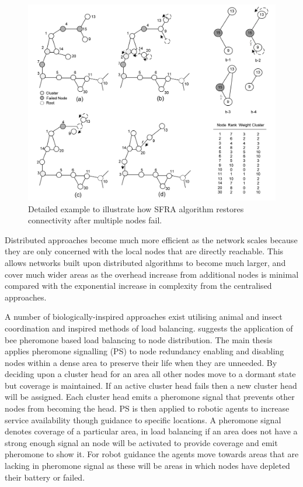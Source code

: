\documentclass[authoryearcitations]{UoYCSproject}
\begin{document}
\begin{figure}
 \centering
    \includegraphics[width=\textwidth]{figures/sfra.png}
    \caption{Detailed example to illustrate how SFRA algorithm restores connectivity after multiple nodes fail.}
    \label{fig:sfra}
\end{figure}

Distributed approaches become much more efficient as the network scales because they are only concerned with the local nodes that are directly reachable. This allows networks built upon distributed algorithms to become much larger, and cover much wider areas as the overhead increase from additional nodes is minimal compared with the exponential increase in complexity from the centralised approaches.

A number of biologically-inspired approaches exist utilising animal and insect coordination and inspired methods of load balancing. \citet{Caliskanelli2014} suggests the application of bee pheromone based load balancing to node distribution. The main thesis applies pheromone signalling (PS) to node redundancy enabling and disabling nodes within a dense area to preserve their life when they are unneeded. By deciding upon a cluster head for an area all other nodes move to a dormant state but coverage is maintained. If an active cluster head fails then a new cluster head will be assigned. Each cluster head emits a pheromone signal that prevents other nodes from becoming the head. PS is then applied to robotic agents to increase service availability though guidance to specific locations. A pheromone signal denotes coverage of a particular area, in load balancing if an area does not have a strong enough signal an node will be activated to provide coverage and emit pheromone to show it. For robot guidance the agents move towards areas that are lacking in pheromone signal as these will be areas in which nodes have depleted their battery or failed.
\end{document}
